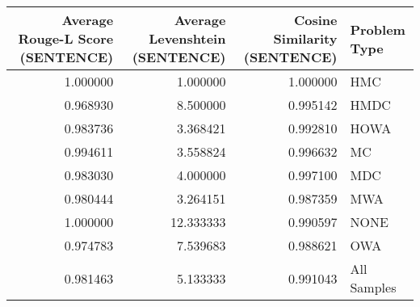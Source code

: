 \begin{tabular}{rrrl}
\toprule
Average Rouge-L Score (SENTENCE) & Average Levenshtein (SENTENCE) & Cosine Similarity (SENTENCE) & Problem Type \\
\midrule
1.000000 & 1.000000 & 1.000000 & HMC \\
0.968930 & 8.500000 & 0.995142 & HMDC \\
0.983736 & 3.368421 & 0.992810 & HOWA \\
0.994611 & 3.558824 & 0.996632 & MC \\
0.983030 & 4.000000 & 0.997100 & MDC \\
0.980444 & 3.264151 & 0.987359 & MWA \\
1.000000 & 12.333333 & 0.990597 & NONE \\
0.974783 & 7.539683 & 0.988621 & OWA \\
0.981463 & 5.133333 & 0.991043 & All Samples \\
\bottomrule
\end{tabular}
